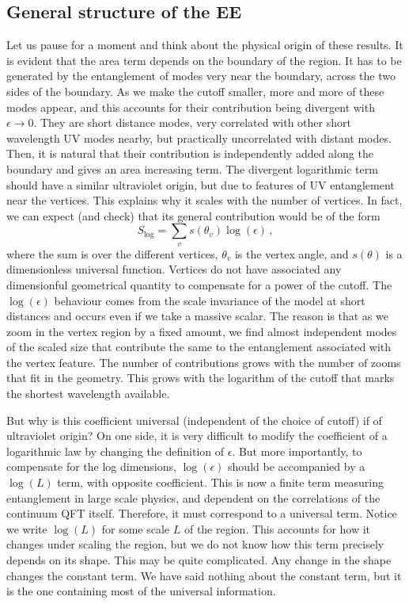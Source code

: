 \documentclass[12pt]{article}
\numberwithin{equation}{section}
\newcommand{\be}{\begin{equation}}
\newcommand{\ee}{\end{equation}}
\begin{document}
\subsection{General structure of the EE}
\label{ge}
Let us pause for a moment and think about the physical origin of these results. It is evident that the area term depends on the boundary of the region. It has to be generated by the entanglement of modes very near the boundary, across the two sides of the boundary. As we make the cutoff smaller, more and more of these modes appear, and this accounts for their contribution being divergent with $\epsilon\rightarrow 0$. They are short distance modes, very correlated with other short wavelength UV modes nearby, but practically uncorrelated with distant modes. Then, it is natural that their contribution is independently added along the boundary and gives an area increasing term. The divergent logarithmic term should have a similar ultraviolet origin, but due to features of UV entanglement near the vertices. 
This explains why it scales with the number of vertices. In fact, we can expect (and check) that its general contribution would be of the form
\be
S_{\log}=\sum_{v} s(\theta_v) \log(\epsilon)\,,
\ee
where the sum is over the different vertices, $\theta_v$ is the vertex angle, and $s(\theta)$ is a dimensionless universal function. Vertices do not have associated any dimensionful geometrical quantity to compensate for a power of the cutoff.  The $\log(\epsilon)$ behaviour comes from the scale invariance of the model at short distances and occurs even if we take a massive scalar. The reason is that as we zoom in the vertex region by a fixed amount, we find almost independent modes of the scaled size that contribute the same to the entanglement associated with the vertex feature. The number of contributions grows with the number of zooms that fit in the geometry. This grows with the logarithm of the cutoff that marks the shortest wavelength available.  

 But why is this coefficient universal (independent of the choice of cutoff) if of ultraviolet origin? On one side, it is very difficult to modify the coefficient of a logarithmic law by changing the definition of $\epsilon$. But more importantly, to compensate for the log dimensions, $\log(\epsilon)$ should be accompanied by a $\log(L)$ term,  with opposite coefficient. This is now a finite term measuring entanglement in large scale physics, and dependent on the correlations of the continuum QFT itself. Therefore, it must correspond to a universal term. Notice we write $\log(L)$ for some scale $L$ of the region. This accounts for how it changes under scaling the region,  but we do not know how this term precisely depends on its shape. This may be quite complicated. Any change in the shape changes the constant term. We have said nothing about the constant term, but it is the one containing most of the universal information.       
\end{document}
